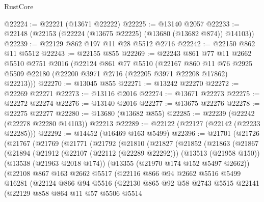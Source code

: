 \begin{lexlean}{RustCore}
\begin{coremodule}
@22224 := @22221 (@13671 @22222)
@22225 := @13140 @2057
@22233 := @22148 (@22153 (@22224 (@13675 @22225) (@13680 (@13682 @874)) @14103))
@22239 := @22129 @862 @197 @11 @28 @5512 @2716
@22242 := @22150 @862 @11 @5512
@22243 := @22155 @855
@22269 := @22243
    @861
    @77
    @11
    @2662
    @5510
    @2751
    @2016
    (@22124
      @861
      @77
      @5510
      (@22167
        @860
        @11
        @76
        @2925
        @5509
        @22180
        (@22200 @3971 @2716 (@22205 @3971 @22208 @17862) @22213)))
@22270 := @13045 @855
@22271 := @13242 @22270
@22272 := @22269 @22271
@22273 := @13116 @2016
@22274 := @13671 @22273
@22275 := @22272 @22274
@22276 := @13140 @2016
@22277 := @13675 @22276
@22278 := @22275 @22277
@22280 := @13680 (@13682 @855)
@22285 := @22239 (@22242 (@22278 @22280 @14103)) @22213
@22289 := @22122 (@22127 (@22142 (@22233 @22285)))
@22292 := @14452 (@16469 @163 @5499)
@22396 := @21701
    (@21726
      (@21767
        (@21769
          (@21771
            (@21792
              (@21810
                (@21827
                  (@21852
                    (@21863
                      (@21867
                        (@21894
                          (@21912
                            (@22107 (@22112 (@22289 @22292)))
                            (@13513 (@21958 @150))
                            (@13538 (@21963 @2018 @174))
                            (@13355 (@21970 @174 @152 @5497 @2662))
                            (@22108
                              @867
                              @163
                              @2662
                              @5517
                              (@22116
                                @866
                                @94
                                @2662
                                @5516
                                @5499
                                @16281
                                (@22124
                                  @866
                                  @94
                                  @5516
                                  (@22130
                                    @865
                                    @92
                                    @58
                                    @2743
                                    @5515
                                    @22141
                                    (@22129
                                      @858
                                      @864
                                      @11
                                      @57
                                      @5506
                                      @5514

\end{coremodule}
\end{lexlean}
